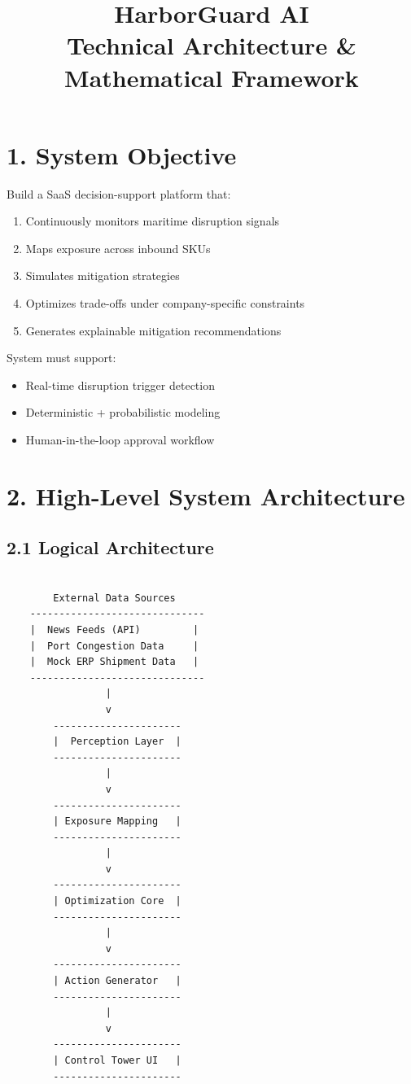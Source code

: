 \documentclass[11pt]{article}
\title{\textbf{HarborGuard AI}\\
Technical Architecture \& Mathematical Framework}
\date{}
\begin{document}
\maketitle

\section*{1. System Objective}

Build a SaaS decision-support platform that:

\begin{enumerate}
    \item Continuously monitors maritime disruption signals
    \item Maps exposure across inbound SKUs
    \item Simulates mitigation strategies
    \item Optimizes trade-offs under company-specific constraints
    \item Generates explainable mitigation recommendations
\end{enumerate}

System must support:
\begin{itemize}
    \item Real-time disruption trigger detection
    \item Deterministic + probabilistic modeling
    \item Human-in-the-loop approval workflow
\end{itemize}

\section*{2. High-Level System Architecture}

\subsection*{2.1 Logical Architecture}

\begin{verbatim}

        External Data Sources
    ------------------------------
    |  News Feeds (API)         |
    |  Port Congestion Data     |
    |  Mock ERP Shipment Data   |
    ------------------------------
                 |
                 v
        ----------------------
        |  Perception Layer  |
        ----------------------
                 |
                 v
        ----------------------
        | Exposure Mapping   |
        ----------------------
                 |
                 v
        ----------------------
        | Optimization Core  |
        ----------------------
                 |
                 v
        ----------------------
        | Action Generator   |
        ----------------------
                 |
                 v
        ----------------------
        | Control Tower UI   |
        ----------------------

\end{verbatim}
\end{document}
